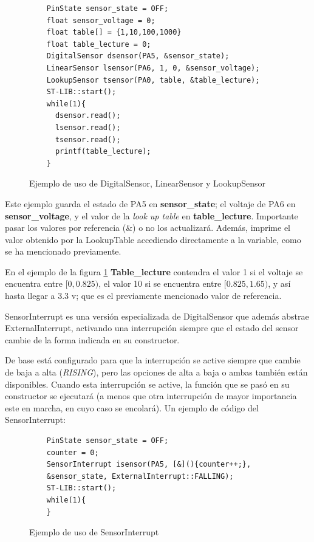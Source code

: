 \documentclass{report}
\begin{document}
\begin{figure}[H]
  \begin{lstlisting}
    PinState sensor_state = OFF;
    float sensor_voltage = 0;
    float table[] = {1,10,100,1000}
    float table_lecture = 0;
    DigitalSensor dsensor(PA5, &sensor_state);
    LinearSensor lsensor(PA6, 1, 0, &sensor_voltage);
    LookupSensor tsensor(PA0, table, &table_lecture);
    ST-LIB::start();
    while(1){
      dsensor.read();
      lsensor.read();
      tsensor.read();
      printf(table_lecture);
    }
  \end{lstlisting}
  \caption{Ejemplo de uso de DigitalSensor, LinearSensor y LookupSensor}
  \label{SensorsCode}
\end{figure}
\par \vspace{0.3cm}
Este ejemplo guarda el estado de PA5 en \textbf{sensor\_state}; el voltaje de PA6 en \textbf{sensor\_voltage}, y el valor de la \textit{look up table} en \textbf{table\_lecture}. Importante pasar los valores por referencia (\&) o no los actualizará. Además, imprime el valor obtenido por la LookupTable accediendo directamente a la variable, como se ha mencionado previamente. \par
En el ejemplo de la figura \ref{SensorsCode} \textbf{Table\_lecture} contendra el valor 1 si el voltaje se encuentra entre $[0, 0.825)$, el valor 10 si se encuentra entre $[0.825, 1.65)$, y así hasta llegar a 3.3 v; que es el previamente mencionado valor de referencia. 
\par \vspace{0.3cm}
SensorInterrupt es una versión especializada de DigitalSensor que además abstrae ExternalInterrupt, activando una interrupción siempre que el estado del sensor cambie de la forma indicada en su constructor. \par 
De base está configurado para que la interrupción se active siempre que cambie de baja a alta (\textit{RISING}), pero las opciones de alta a baja o ambas también están disponibles. Cuando esta interrupción se active, la función que se pasó en su constructor se ejecutará (a menos que otra interrupción de mayor importancia este en marcha, en cuyo caso se encolará).
Un ejemplo de código del SensorInterrupt:
\begin{figure}[H]
  \begin{lstlisting}
    PinState sensor_state = OFF;
    counter = 0;
    SensorInterrupt isensor(PA5, [&](){counter++;}, 
    &sensor_state, ExternalInterrupt::FALLING);
    ST-LIB::start();
    while(1){
    }
  \end{lstlisting}
  \caption{Ejemplo de uso de SensorInterrupt}
  \label{SensorInterruptCode}
\end{figure}
\end{document}

